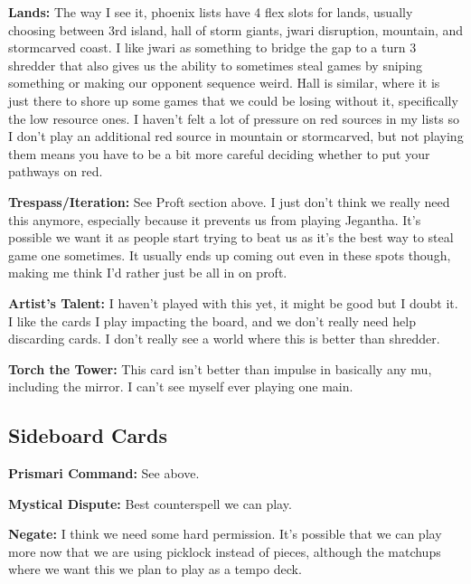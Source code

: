 \documentclass[12pt]{article}
\begin{document}
\vspace{0.4em}
\noindent \textbf{Lands:}
The way I see it, phoenix lists have 4 flex slots for lands, usually choosing between 3rd island, hall of storm giants, jwari disruption, mountain, and stormcarved coast. I like jwari as something to bridge the gap to a turn 3 shredder that also gives us the ability to sometimes steal games by sniping something or making our opponent sequence weird. Hall is similar, where it is just there to shore up some games that we could be losing without it, specifically the low resource ones. I haven't felt a lot of pressure on red sources in my lists so I don't play an additional red source in mountain or stormcarved, but not playing them means you have to be a bit more careful deciding whether to put your pathways on red.

\vspace{0.4em}
\noindent \textbf{Trespass/Iteration:}
See Proft section above. I just don't think we really need this anymore, especially because it prevents us from playing Jegantha. It's possible we want it as people start trying to beat us as it's the best way to steal game one sometimes. It usually ends up coming out even in these spots though, making me think I'd rather just be all in on proft.

\vspace{0.4em}
\noindent \textbf{Artist's Talent:}
I haven't played with this yet, it might be good but I doubt it. I like the cards I play impacting the board, and we don't really need help discarding cards. I don't really see a world where this is better than shredder.

\vspace{0.4em}
\noindent \textbf{Torch the Tower:}
This card isn't better than impulse in basically any mu, including the mirror. I can't see myself ever playing one main.

\subsection{Sideboard Cards}
\label{sec:sbchoices}
\noindent \textbf{Prismari Command:}
See above.

\vspace{0.4em}
\noindent \textbf{Mystical Dispute:}
Best counterspell we can play.

\vspace{0.4em}
\noindent \textbf{Negate:}
I think we need some hard permission. It's possible that we can play more now that we are using picklock instead of pieces, although the matchups where we want this we plan to play as a tempo deck.
\end{document}
